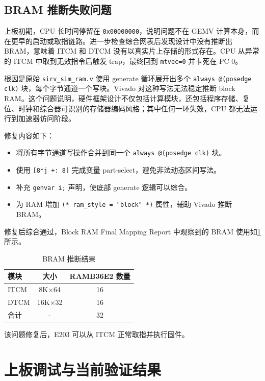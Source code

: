 \documentclass[12pt, a4paper]{article}
\begin{document}
\subsection{BRAM 推断失败问题}

上板初期，CPU 长时间停留在 \texttt{0x00000000}，说明问题不在 GEMV 计算本身，而在更早的启动或取指链路。进一步检查综合网表后发现设计中没有推断出 BRAM，意味着 ITCM 和 DTCM 没有以真实片上存储的形式存在。CPU 从异常的 ITCM 中取到无效指令后触发 trap，最终回到 \texttt{mtvec=0} 并卡死在 PC 0。

根因是原始 \texttt{sirv\_sim\_ram.v} 使用 generate 循环展开出多个 \texttt{always @(posedge clk)} 块，每个字节通道一个写块。Vivado 对这种写法无法稳定推断 block RAM。这个问题说明，硬件框架设计不仅包括计算模块，还包括程序存储、复位、时钟和综合器可识别的存储器编码风格；其中任何一环失效，CPU 都无法运行到加速器访问阶段。

修复内容如下：

\begin{itemize}
    \item 将所有字节通道写操作合并到同一个 \texttt{always @(posedge clk)} 块。
    \item 使用 \texttt{[8*j +: 8]} 完成变量 part-select，避免非法动态区间写法。
    \item 补充 \texttt{genvar i;} 声明，使底部 generate 逻辑可以综合。
    \item 为 RAM 增加 \texttt{(* ram\_style = "block" *)} 属性，辅助 Vivado 推断 BRAM。
\end{itemize}

修复后综合通过，Block RAM Final Mapping Report 中观察到的 BRAM 使用如\cref{tab:bram} 所示。

\begin{table}[H]
    \centering
    \caption{BRAM 推断结果}
    \label{tab:bram}
    \begin{tabular}{lcc}
        \toprule
        \textbf{模块} & \textbf{大小} & \textbf{RAMB36E2 数量} \\
        \midrule
        ITCM & 8K$\times$64 & 16 \\
        DTCM & 16K$\times$32 & 16 \\
        合计 & - & 32 \\
        \bottomrule
    \end{tabular}
\end{table}

该问题修复后，E203 可以从 ITCM 正常取指并执行固件。

\section{上板调试与当前验证结果}
\end{document}
